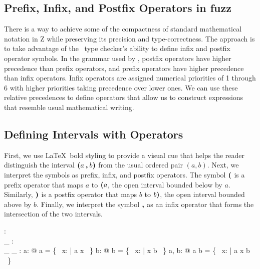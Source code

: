 \documentclass{amsart}
\begin{document}
\subsection{Prefix, Infix, and Postfix Operators in fuzz}

There is a way to achieve some of the compactness of standard mathematical notation in Z while
preserving its precision and type-correctness.
The approach is to take advantage of the \fuzz\ type checker's ability to define infix and postfix 
operator symbols. 
In the grammar used by \fuzz, postfix operators have higher precedence than prefix operators,
and prefix operators have higher precedence than infix operators.
Infix operators are assigned numerical priorities of 1 through 6 with higher priorities taking precedence 
over lower ones.
We can use these relative precedences to define operators that allow us to construct expressions 
that resemble usual mathematical writing.

\subsection{Defining Intervals with Operators}

First, we use \LaTeX\ bold styling to provide a visual cue that helps the reader
distinguish the interval $\boldsymbol{(} a \mathbin{\boldsymbol{,}} b \boldsymbol{)}$ from the
usual ordered pair $(a, b)$.
Next, we interpret the symbols as prefix, infix, and postfix operators.
The symbol $\boldsymbol{(}$ is a prefix operator that maps $a$ to $\boldsymbol{(} a$, 
the open interval bounded below by $a$.
Similarly, $\boldsymbol{)}$ is a postfix operator that maps $b$ to $b \boldsymbol{)}$, 
the open interval bounded above by $b$.
Finally, we interpret the symbol $\mathbin{\boldsymbol{,}}$ as an infix operator that forms the intersection of the two intervals.

\begin{axdef}
	\lowerBound: \R \fun \power \R \\
	\_ \upperBound: \R \fun \power \R \\
	\_ \intersect \_ : \power \R \cross \power \R \fun \power \R
\where
	\forall a: \R @ \lowerBound a = \{~ x: \R | a \ltR x ~\}
\also
	\forall b: \R @ b \upperBound = \{~ x: \R | x \ltR b ~\}
\also
	\forall a, b: \R @ \lowerBound a \intersect b \upperBound = \{~ x: \R | a \ltR x \ltR b ~\}
\end{axdef}
\end{document}
